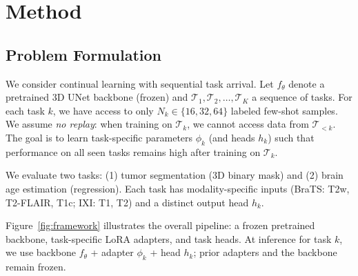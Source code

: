 \section{Method}
\label{sec:method}

\subsection{Problem Formulation}
\label{sec:problem}

We consider continual learning with sequential task arrival. Let $f_\theta$ denote a pretrained 3D UNet backbone (frozen) and $\mathcal{T}_1, \mathcal{T}_2, \ldots, \mathcal{T}_K$ a sequence of tasks. For each task $k$, we have access to only $N_k \in \{16, 32, 64\}$ labeled few-shot samples. We assume \emph{no replay}: when training on $\mathcal{T}_k$, we cannot access data from $\mathcal{T}_{<k}$. The goal is to learn task-specific parameters $\phi_k$ (and heads $h_k$) such that performance on all seen tasks remains high after training on $\mathcal{T}_k$.

We evaluate two tasks: (1) tumor segmentation (3D binary mask) and (2) brain age estimation (regression). Each task has modality-specific inputs (BraTS: T2w, T2-FLAIR, T1c; IXI: T1, T2) and a distinct output head $h_k$.

Figure~\ref{fig:framework} illustrates the overall pipeline: a frozen pretrained backbone, task-specific LoRA adapters, and task heads. At inference for task $k$, we use backbone $f_\theta$ + adapter $\phi_k$ + head $h_k$; prior adapters and the backbone remain frozen.

